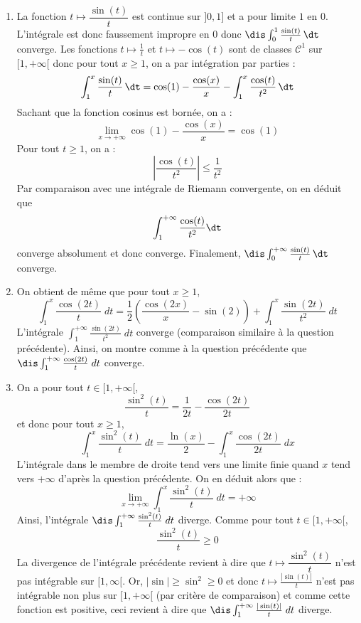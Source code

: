 \documentclass[a4paper,10pt]{report}
\begin{document}
\corr 
\begin{enumerate}
\item La fonction $t\mapsto \dfrac{\sin(t)}{t}$ est continue sur $]0,1]$ et a pour limite $1$ en $0$. L'intégrale est donc faussement impropre en $0$ donc $\dis \int_0^1\frac{\sin(t)}{t}\, \dt$ converge. Les fonctions $t \mapsto \frac{1}{t}$ et $t \mapsto - \cos(t)$ sont de classes $\mathcal{C}^1$ sur $[1, + \infty[$ donc pour tout $x \geq 1$, on a par intégration par parties :
\[\int_1^x\frac{\sin(t)}{t}\, \dt=\cos(1)-\frac{\cos(x)}{x}-\int_1^x\frac{\cos(t)}{t^2}\, \dt\]
Sachant que la fonction cosinus est bornée, on a :
$$ \lim_{x \rightarrow + \infty} \cos(1)-\frac{\cos(x)}{x} = \cos(1)$$
Pour tout $t \geq 1$, on a :
$$ \left\vert \frac{\cos(t)}{t^2} \right\vert \leq \frac{1}{t^2}$$
Par comparaison avec une intégrale de Riemann convergente, on en déduit que 
$$ \int_{1}^{+ \infty} \frac{\cos(t)}{t^2} \dt$$
converge absolument et donc converge. Finalement, $\dis \int_0^{+ \infty} \frac{\sin(t)}{t}\, \dt$ converge.  
\item On obtient de m\^eme  que pour tout $x \geq 1$,
\[\int_1^x\frac{\cos(2t)}{t}\;dt=\frac{1}{2}\left (\frac{\cos(2x)}{x}-\sin(2)\right )+\int_1^x\frac{\sin(2t)}{t^2}\;dt\]
L'intégrale $\int_1^{+ \infty} \frac{\sin(2t)}{t^2}\;dt$ converge (comparaison similaire à la question précédente). Ainsi, on montre comme \`a la question pr\'ec\'edente que $\dis \int_1^{+\infty}\frac{\cos(2t)}{t}\;dt$ converge.
\item On a pour tout $t \in [1, + \infty[$,
$$\frac{\sin^2(t)}{t}=\frac{1}{2t}-\frac{\cos(2t)}{2t}$$
 et donc pour tout $x \geq 1$,
\[\int_1^x\frac{\sin^2(t)}{t}\;dt=\frac{\ln(x)}{2}-\int_1^x\frac{\cos(2t)}{2t}\;dx\]
L'intégrale dans le membre de droite tend vers une limite finie quand $x$ tend vers $+ \infty$ d'après la question précédente. On en déduit alors que :
$$ \lim_{x \rightarrow + \infty} \int_1^x\frac{\sin^2(t)}{t}\;dt = + \infty$$
 Ainsi, l'int\'egrale $\dis \int_1^{+\infty}\frac{\sin^2(t)}{t}\;dt$ diverge.
Comme pour tout $t \in [1, + \infty[$, 
$$\frac{\sin^2(t)}{t}\geq0$$
La divergence de l'intégrale précédente revient \`a dire que $t\mapsto \dfrac{\sin^2(t)}{t}$ n'est pas int\'egrable sur $[1,\infty[$. Or, $|\sin|\geq \sin^2\geq 0$ et donc $t\mapsto \frac{|\sin(t)|}{t}$ n'est pas int\'egrable non plus sur $[1,+\infty[$ (par critère de comparaison) et comme cette fonction est positive, ceci revient \`a dire que $\dis \int_1^{+\infty}\frac{|\sin(t)|}{t}\;dt$ diverge.
\end{enumerate}
\end{document}
